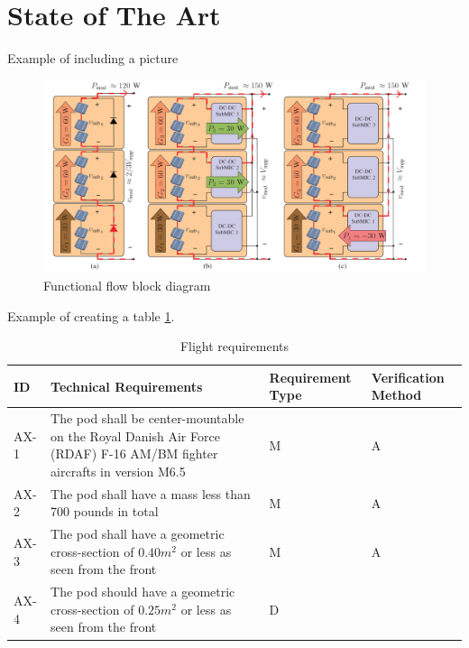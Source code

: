 \section{State of The Art}

Example of including a picture
\begin{figure}[htbp]
	\includegraphics[width=\linewidth]{../Pictures/test.png}
	\caption{Functional flow block diagram}
	\label{fig:TimePlan}
\end{figure}

Example of creating a table \ref{table}.
\begin{table}[htbp]
	\begin{tabular}{|m{1.5cm}|m{8cm}|m{2.5cm}|m{2.5cm}|}
		\hline
		\rowcolor{lightgray} \textbf{ID} & \textbf{Technical Requirements}  & \textbf{Requirement Type}  &  \textbf{Verification Method}    \\ \hline
		AX-1 & The pod shall be center-mountable on the Royal Danish Air Force (RDAF) F-16 AM/BM fighter aircrafts in version M6.5     & M   & A      \\ \hline
		\rowcolor{Seashell2} AX-2 & The pod shall have a mass less than 700 pounds in total & M  & A        \\ \hline
		AX-3 & The pod shall have a geometric cross-section of $0.40m^2$  or less as seen from the front   &  M   & A                \\ \hline
		\rowcolor{Seashell2} AX-4 & The pod should have a geometric cross-section of $0.25m^2$ or less as seen from the front   &  D   &                \\ \hline
	\end{tabular}
	\caption{Flight requirements}
	\label{table}
\end{table}